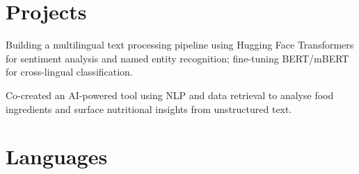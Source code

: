 \section{Projects}

\begin{bullets}
    \item Building a multilingual text processing pipeline using Hugging Face Transformers for sentiment analysis and named entity recognition; fine-tuning BERT/mBERT for cross-lingual classification.
\end{bullets}

\begin{bullets}
    \item Co-created an AI-powered tool using NLP and data retrieval to analyse food ingredients and surface nutritional insights from unstructured text.
\end{bullets}

\section{Languages}

%
\contactsep%
%
\contactsep%
